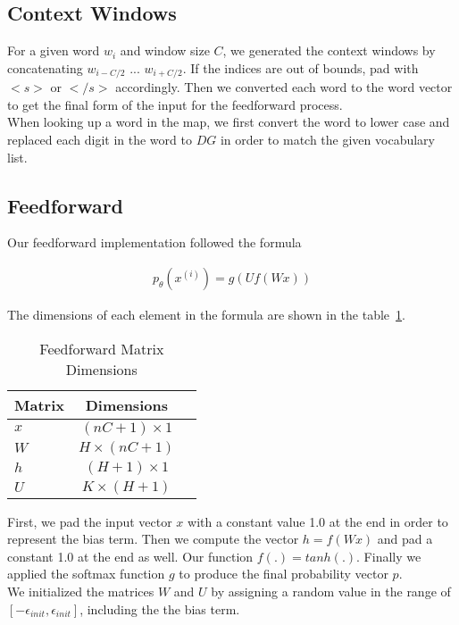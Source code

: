 \documentclass[12pt]{article}
\begin{document}
\subsection{Context Windows}
For a given word $w_i$ and window size $C$, we generated the context windows by concatenating $w_{i-C/2}$ ... $w_{i+C/2}$. If the indices are out of bounds, pad with $<s>$ or $</s>$ accordingly. Then we converted each word to the word vector to get the final form of the input for the feedforward process.\\
When looking up a word in the map, we first convert the word to lower case and replaced each digit in the word to $DG$ in order to match the given vocabulary list.


\subsection{Feedforward}
Our feedforward implementation followed the formula

\begin{align*}
p_\theta(x^(i))=g(Uf(Wx))
\end{align*}

The dimensions of each element in the formula are shown in the table~\ref{tab:dim}.

\begin{table}[H]
	\begin{center}
		\begin{tabular}{|l|c|c|}
			\hline
			Matrix & Dimensions \\\hline
			$x$ & ${(nC+1)}\times{1}$ \\\hline
			$W$ & ${H}\times{(nC+1)}$ \\\hline
			$h$ & ${(H+1)}\times{1}$ \\\hline
			$U$ & ${K}\times{(H+1)}$ \\\hline
		\end{tabular}
	\end{center}
	\caption{Feedforward Matrix Dimensions}
	\label{tab:dim}
\end{table}

First, we pad the input vector $x$ with a constant value 1.0 at the end in order to represent the bias term. Then we compute the vector $h=f(Wx)$ and pad a constant 1.0 at the end as well. Our function $f(.) = tanh(.)$. Finally we applied the softmax function $g$ to produce the final probability vector $p$.\\
We initialized the matrices $W$ and $U$ by assigning a random value in the range of $[-\epsilon_{init}, \epsilon_{init}]$, including the the bias term.
\end{document}
